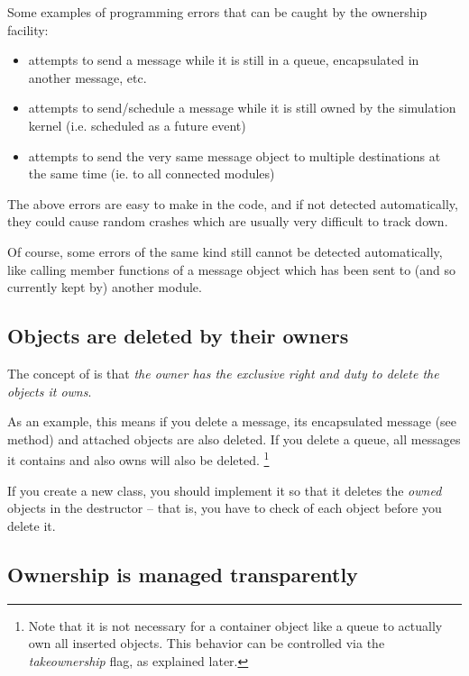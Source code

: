 Some examples of programming errors that can be caught
by the ownership facility:

\begin{itemize}
    \item{attempts to send a message while it is still in a queue,
    encapsulated in another message, etc.}

    \item{attempts to send/schedule a message while it is still owned
    by the simulation kernel (i.e. scheduled as a future event)}

    \item{attempts to send the very same message object to multiple
    destinations at the same time (ie. to all connected modules)}
\end{itemize}

The above errors are easy to make in the code, and if not
detected automatically, they could cause random crashes
which are usually very difficult to track down.

Of course, some errors of the same kind still cannot be detected
automatically, like calling member functions of a message object
which has been sent to (and so currently kept by) another module.


\subsection{Objects are deleted by their owners}

The concept of  is that \textit{the owner has the
exclusive right and duty to delete the objects it owns}.

As an example, this means if you delete a message, its encapsulated
message (see  method) and attached
 objects are also deleted. If you delete a queue,
all messages it contains and also owns will also be deleted.
  \footnote{Note that it is not necessary for a container object like
  a queue to actually own all inserted objects. This behavior
  can be controlled via the \textit{takeownership} flag,
  as explained later.}

If you create a new class, you should implement it so that
it deletes the \textit{owned} objects in the destructor --
that is, you have to check  of each object
before you delete it.


\subsection{Ownership is managed transparently}

